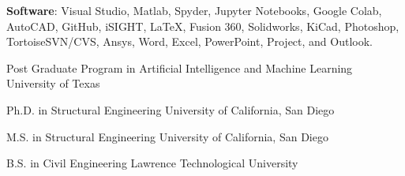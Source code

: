 \documentclass{leresume}
\begin{document}
\begin{bulletedlist}
		\item \textbf{Software}: Visual Studio,
                        Matlab,
                        Spyder,
                        Jupyter Notebooks,
                        Google Colab,
                        AutoCAD,
                        GitHub,
                        iSIGHT,
                        LaTeX,
                        Fusion 360,
                        Solidworks,
                        KiCad,
                        Photoshop,
                        TortoiseSVN/CVS,
                        Ansys,
                        Word,
                        Excel,
                        PowerPoint,
                        Project,
                        and Outlook.
                        
	\end{bulletedlist}
	

	
                {Post Graduate Program in Artificial Intelligence and Machine Learning}
                {University of Texas}
		
                {Ph.D. in Structural Engineering}
                {University of California, San Diego}
		
                {M.S. in Structural Engineering}
                {University of California, San Diego}
		
                {B.S. in Civil Engineering}
                {Lawrence Technological University}
		

    
\end{document}
